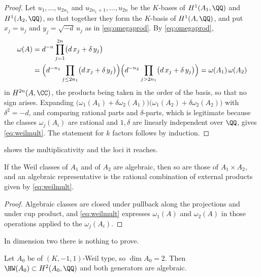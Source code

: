 \begin{proof}
Let $u_{1},\dots,u_{2n_{1}}$ and $u_{2n_{1}+1},\dots,u_{2n}$ be the
$K$-bases of $H^{1}(A_{1},\QQ)$ and $H^{1}(A_{2},\QQ)$, so that together they
form the $K$-basis of $H^{1}(A,\QQ)$, and put $x_{j}=u_{j}$ and
$y_{j}=\sqrt{-d}\,u_{j}$ as in \eqref{eq:omegaprod}. By \eqref{eq:omegaprod},
\[
\begin{aligned}
  \omega(A)
  &=d^{-n}\prod_{j=1}^{2n}\bigl(d\,x_{j}+\delta\,y_{j}\bigr)\\
  &=\Bigl(d^{-n_{1}}\prod_{j\le2n_{1}}\bigl(d\,x_{j}+\delta\,y_{j}\bigr)\Bigr)
   \Bigl(d^{-n_{2}}\prod_{j>2n_{1}}\bigl(d\,x_{j}+\delta\,y_{j}\bigr)\Bigr)
  =\omega(A_{1})\,\omega(A_{2})
\end{aligned}
\]
in $H^{2n}(A,\CC)$, the products being taken in the order of the basis, so
that no sign arises. Expanding
$\bigl(\omega_{1}(A_{1})+\delta\omega_{2}(A_{1})\bigr)
\bigl(\omega_{1}(A_{2})+\delta\omega_{2}(A_{2})\bigr)$ with $\delta^{2}=-d$,
and comparing rational parts and $\delta$-parts, which is legitimate because
the classes $\omega_{j}(A_{i})$ are rational and $1,\delta$ are linearly
independent over $\QQ$, gives \eqref{eq:weilmult}. The statement for $k$
factors follows by induction.
\end{proof}

 shows the multiplicativity and the loci it reaches.

\begin{corollary}\label{cor:prodalg}
If the Weil classes of $A_{1}$ and of $A_{2}$ are algebraic, then so are those
of $A_{1}\times A_{2}$, and an algebraic representative is the rational
combination of external products given by \eqref{eq:weilmult}.
\end{corollary}

\begin{proof}
Algebraic classes are closed under pullback along the projections and under
cup product, and \eqref{eq:weilmult} expresses $\omega_{1}(A)$ and
$\omega_{2}(A)$ in those operations applied to the $\omega_{j}(A_{i})$.
\end{proof}

In dimension two there is nothing to prove.

\begin{lemma}\label{lem:basecase}
Let $A_{0}$ be of $(K,-1,1)$-Weil type, so $\dim A_{0}=2$. Then
$\HW(A_{0})\subset H^{2}(A_{0},\QQ)$ and both generators are algebraic.
\end{lemma}

